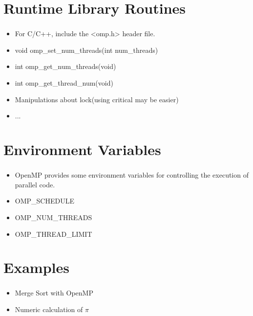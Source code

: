 \documentclass{beamer}
\begin{document}
	\section{Runtime Library Routines}
	\begin{frame}
		\frametitle{\insertsection}
		\begin{itemize}
			\item For C/C++, include the <omp.h> header file.
			\item void omp\_set\_num\_threads(int num\_threads)
			\item int omp\_get\_num\_threads(void)
			\item int omp\_get\_thread\_num(void)
			\item Manipulations about lock(using critical may be easier)
			\item ...
		\end{itemize}
	\end{frame}
	
	\section{Environment Variables}
	\begin{frame}
		\frametitle{\insertsection}
		\begin{itemize}
			\item OpenMP provides some environment variables for controlling the execution of parallel code.
			\item OMP\_SCHEDULE
			\item OMP\_NUM\_THREADS
			\item OMP\_THREAD\_LIMIT
		\end{itemize}
	\end{frame}
	
	\section{Examples}
	\begin{frame}
		\frametitle{\insertsection}
		\begin{itemize}
			\item Merge Sort with OpenMP
			\item Numeric calculation of $\pi$
		\end{itemize}
	\end{frame}
\end{document}
